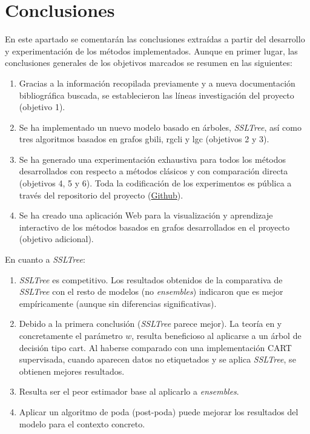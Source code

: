 
\newpage
\chapter{Conclusiones}
\label{conclusiones}

En este apartado se comentarán las conclusiones extraídas a partir del desarrollo y experimentación de los métodos implementados. Aunque en primer lugar, las conclusiones generales de los objetivos marcados se resumen en las siguientes:

\begin{enumerate}[label=\destacado{\arabic*.}]
  \setlength\itemsep{1em}
  
  \item Gracias a la información recopilada previamente y a nueva documentación bibliográfica buscada, se establecieron las líneas investigación del proyecto (objetivo 1).
  \item Se ha implementado un nuevo modelo basado en árboles, \textit{SSLTree}, así como tres algoritmos basados en grafos \Gls{gbili}, \Gls{rgcli} y \Gls{lgc} (objetivos 2 y 3).
  \item Se ha generado una experimentación exhaustiva para todos los métodos desarrollados con respecto a métodos clásicos y con comparación directa (objetivos 4, 5 y 6). Toda la codificación de los experimentos es pública a través del repositorio del proyecto (\href{https://github.com/dmacha27/TFM-VIU}{Github}).
  \item Se ha creado una aplicación Web para la visualización y aprendizaje interactivo de los métodos basados en grafos desarrollados en el proyecto (objetivo adicional).

\end{enumerate}

En cuanto a \textit{SSLTree}:

\begin{enumerate}[label=\destacado{\arabic*.}]
  \setlength\itemsep{1em}
    \setcounter{enumi}{4}
  \item \textit{SSLTree} es competitivo. Los resultados obtenidos de la comparativa de \textit{SSLTree} con el resto de modelos (no \textit{ensembles}) indicaron que es mejor empíricamente (aunque sin diferencias significativas). 

  \item Debido a la primera conclusión (\textit{SSLTree} parece mejor). La teoría en \cite{levatic2017semi} y concretamente el parámetro $w$, resulta beneficioso al aplicarse a un árbol de decisión tipo \Gls{cart}. Al haberse comparado con una implementación CART supervisada, cuando aparecen datos no etiquetados y se aplica \textit{SSLTree}, se obtienen mejores resultados.

  \item Resulta ser el peor estimador base al aplicarlo a \textit{ensembles}.

  \item Aplicar un algoritmo de poda (post-poda) puede mejorar los resultados del modelo para el contexto concreto.

\end{enumerate}


